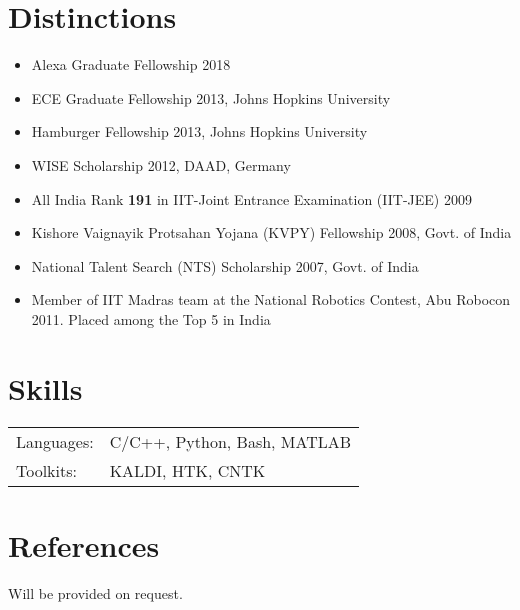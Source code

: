 \documentclass[margin,line,pifont,palatino,courier]{res}
\begin{document}
\begin{resume}
\section{\sc Distinctions}
\begin{itemize} \itemsep -2pt
    \item Alexa Graduate Fellowship 2018
    \item ECE Graduate Fellowship 2013, Johns Hopkins University
    \item Hamburger Fellowship 2013, Johns Hopkins University
    \item WISE Scholarship 2012, DAAD, Germany
    \item All India Rank \textbf{191} in {IIT-Joint Entrance Examination (IIT-JEE)} 2009%
    \item Kishore Vaignayik Protsahan Yojana (KVPY) Fellowship 2008, Govt. of India %
    \item National Talent Search (NTS) Scholarship 2007, Govt. of India %
    \item Member of IIT Madras team at the National Robotics Contest, Abu Robocon 2011. Placed among the Top 5 in India
  \end{itemize}

\section{\sc Skills}

\begin{tabular}{@{}p{0.8in}p{6in}}

Languages:& C/C++, Python, Bash, MATLAB\\
Toolkits: & KALDI, HTK, CNTK \\

\end{tabular}

\section{\sc References}

Will be provided on request.

\end{resume}
\end{document}
